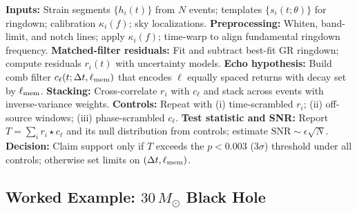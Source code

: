 \documentclass[11pt,a4paper]{article}
\providecommand{\texorpdfstring}[2]{#1}
\theoremstyle{plain}
\theoremstyle{definition}
\theoremstyle{remark}
\begin{document}
\begin{algorithm}[t!]
\caption{Echo-stacking protocol with nuisance controls}
\label{alg:echo-stack}
\begin{algorithmic}[1]
\State \textbf{Inputs:} Strain segments $\{h_i(t)\}$ from $N$ events; templates $\{s_i(t;\theta)\}$ for ringdown; calibration $\kappa_i(f)$; sky localizations.
\State \textbf{Preprocessing:} Whiten, band-limit, and notch lines; apply $\kappa_i(f)$; time-warp to align fundamental ringdown frequency.
\State \textbf{Matched-filter residuals:} Fit and subtract best-fit GR ringdown; compute residuals $r_i(t)$ with uncertainty models.
\State \textbf{Echo hypothesis:} Build comb filter $c_\ell(t;\Delta t,\ell_{\rm mem})$ that encodes $\ell$ equally spaced returns with decay set by $\ell_{\rm mem}$.
\State \textbf{Stacking:} Cross-correlate $r_i$ with $c_\ell$ and stack across events with inverse-variance weights.
\State \textbf{Controls:} Repeat with (i) time-scrambled $r_i$; (ii) off-source windows; (iii) phase-scrambled $c_\ell$.
\State \textbf{Test statistic and SNR:} Report $T=\sum_i r_i\star c_\ell$ and its null distribution from controls; estimate $\mathrm{SNR}\sim \epsilon\sqrt{N}$.
\State \textbf{Decision:} Claim support only if $T$ exceeds the $p<0.003$ (3$\sigma$) threshold under all controls; otherwise set limits on $(\Delta t,\ell_{\rm mem})$.
\end{algorithmic}
\end{algorithm}



\subsection{Worked Example: $30\,M_\odot$ Black Hole}
\end{document}
